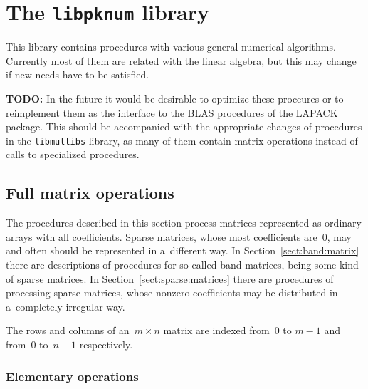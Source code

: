 

\chapter{The \texttt{libpknum} library}

This library contains procedures with various general numerical algorithms.
Currently most of them are related with the linear algebra, but this may
change if new needs have to be satisfied.

\vspace{\medskipamount}
\noindent
\textbf{TODO:} In the future it would be desirable to optimize
these proceures or to reimplement them as the interface to the
BLAS procedures of the LAPACK package. This should be accompanied with
the appropriate changes of procedures in the \texttt{libmultibs}
library, as many of them contain matrix operations instead of
calls to specialized procedures.


\section{Full matrix operations}

The procedures described in this section process matrices represented
as ordinary arrays with all coefficients. Sparse matrices, whose most
coefficients are~$0$, may and often should be represented in a~different way.
In Section~\ref{sect:band:matrix} there are descriptions of procedures
for so called band matrices, being some kind of sparse matrices.
In Section~\ref{sect:sparse:matrices} there are procedures of processing
sparse matrices, whose nonzero coefficients may be distributed in
a~completely irregular way.

The rows and columns of an~$m\times n$ matrix are indexed from~$0$ to $m-1$
and from~$0$ to~$n-1$ respectively.


\subsection{Elementary operations}

